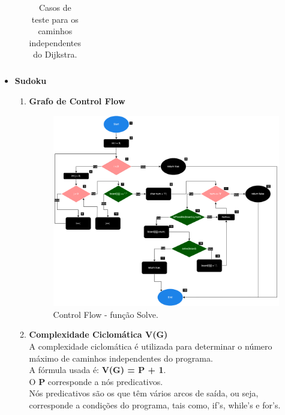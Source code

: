 \documentclass{article}
\begin{document}
\begin{itemize}
\begin{enumerate}
\begin{table}[H]
\begin{tabular}{|c|p{7cm}|p{3cm}|}
    \end{tabular}
    \caption{Casos de teste para os caminhos independentes do Dijkstra.}
    \label{tab:tabela_exemplo}
\end{table}
\clearpage

  
  

\end{enumerate}
\item \textbf{Sudoku}
\begin{enumerate}
    \item \textbf{Grafo de Control Flow}\\
    \begin{figure}[H]
        \centering
        \includegraphics[width=\textwidth]{Images/ControlFlowSudoku.png}
        \caption{Control Flow - função Solve.} 
        \label{fig:ControlFlow-Sudoku}
    \end{figure}
    \item \textbf{Complexidade Ciclomática V(G)}\\
    
    \quad A complexidade ciclomática é utilizada para determinar o número máximo de caminhos independentes do programa.\\
    \quad A fórmula usada é: \textbf{V(G) = P + 1}.\\
  
    O \textbf{P} corresponde a nós predicativos.\\
  
    Nós predicativos são os que têm vários arcos de saída, ou seja, corresponde a condições do programa, tais como, if's, while's e for's.
  

\end{enumerate}
\end{itemize}
\end{document}
